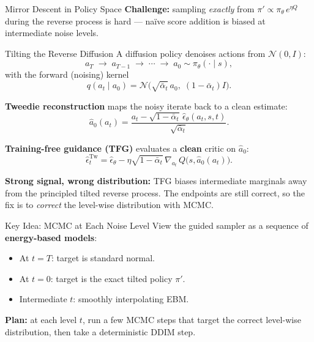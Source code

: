 \documentclass[final,hyperref={pdfpagelabels=false}]{beamer}
\newlength{\colwidth}
\begin{document}
\begin{frame}[t]
\begin{columns}[t]
\begin{column}{\colwidth}
\begin{block}{\Large Mirror Descent in Policy Space}
\vspace{0.4em}
\textbf{Challenge:} sampling \emph{exactly} from $\pi'\propto\pi_\theta\,e^{\eta Q}$ during the reverse process is hard --- na\"ive score addition is biased at intermediate noise levels.
\end{block}

\vspace{1cm}

\begin{block}{\Large Tilting the Reverse Diffusion}
A diffusion policy denoises actions from $\mathcal{N}(0,I)$:
\[
a_T \;\to\; a_{T-1} \;\to\; \cdots \;\to\; a_0 \sim \pi_\theta(\cdot\mid s),
\]
with the forward (noising) kernel
\[
q(a_t\mid a_0)=\mathcal{N}\!\bigl(\sqrt{\bar\alpha_t}\,a_0,\;(1-\bar\alpha_t)I\bigr).
\]

\vspace{0.3em}
\textbf{Tweedie reconstruction} maps the noisy iterate back to a clean estimate:
\[
\hat a_0(a_t)=\frac{a_t-\sqrt{1-\bar\alpha_t}\,\hat\epsilon_\theta(a_t,s,t)}{\sqrt{\bar\alpha_t}}.
\]

\vspace{0.3em}
\textbf{Training-free guidance (TFG)} evaluates a \textbf{clean} critic on $\hat a_0$:
\[
\hat\epsilon_t^{\mathrm{Tw}} = \hat\epsilon_\theta - \eta\sqrt{1-\bar\alpha_t}\,\nabla_{a_t}\,Q\!\bigl(s,\hat a_0(a_t)\bigr).
\]

\vspace{0.3em}
\textbf{Strong signal, wrong distribution:} TFG biases intermediate marginals away from the principled tilted reverse process. The endpoints are still correct, so the fix is to \emph{correct} the level-wise distribution with MCMC.
\end{block}

\vspace{1cm}

\begin{block}{\Large Key Idea: MCMC at Each Noise Level}
View the guided sampler as a sequence of \textbf{energy-based models}:
\begin{itemize}
    \item At $t=T$: target is standard normal.
    \item At $t=0$: target is the exact tilted policy $\pi'$.
    \item Intermediate $t$: smoothly interpolating EBM.
\end{itemize}

\vspace{0.3em}
\textbf{Plan:} at each level $t$, run a few MCMC steps that target the correct level-wise distribution, then take a deterministic DDIM step.
\end{block}


\end{column}
\end{columns}
\end{frame}
\end{document}
